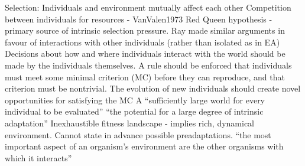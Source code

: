 Selection:
Individuals and environment mutually affect each other \parencite{Taylor2001}
Competition between individuals for resources - VanValen1973 Red Queen hypothesis - primary source of intrinsic selection pressure. \parencite{Taylor2001}
Ray made similar arguments in favour of interactions with other individuals (rather than isolated as in EA) 
Decisions about how and where individuals interact with the world should be made by the individuals themselves. \parencite{Soros2014}
A rule should be enforced that individuals must meet some minimal criterion (MC) before they can reproduce, and that criterion must be nontrivial.\parencite{Soros2014}
The evolution of new individuals should create novel opportunities for satisfying the MC \parencite{Soros2014}
A ``sufficiently large world for every individual to be evaluated'' \parencite{Soros2014}
``the potential for a large degree of intrinsic adaptation'' \parencite{Taylor2001}
Inexhaustible fitness landscape - implies rich, dynamical environment. \parencite{Vasas2015}
Cannot state in advance possible preadaptations. \parencite{Vasas2015}
``the most important aspect of an organism's environment are the other organisms with which it interacts'' \parencite{Maley1999}

